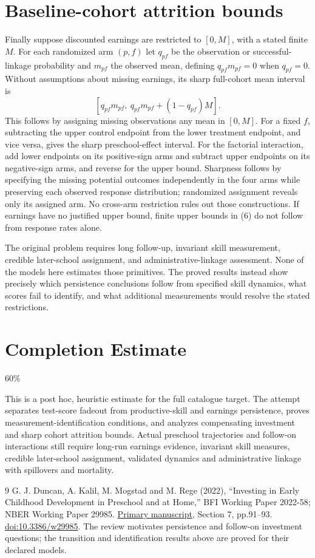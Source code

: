 \documentclass[11pt,a4paper]{article}
\theoremstyle{remark}
\begin{document}
\section{Baseline-cohort attrition bounds}
Finally suppose discounted earnings are restricted to $[0,M]$, with a stated finite $M$. For each randomized arm $(p,f)$ let $q_{pf}$ be the observation or successful-linkage probability and $m_{pf}$ the observed mean, defining $q_{pf}m_{pf}=0$ when $q_{pf}=0$. Without assumptions about missing earnings, its sharp full-cohort mean interval is
\[
 [q_{pf}m_{pf},\ q_{pf}m_{pf}+(1-q_{pf})M]. \tag{6}
\]
This follows by assigning missing observations any mean in $[0,M]$. For a fixed $f$, subtracting the upper control endpoint from the lower treatment endpoint, and vice versa, gives the sharp preschool-effect interval. For the factorial interaction, add lower endpoints on its positive-sign arms and subtract upper endpoints on its negative-sign arms, and reverse for the upper bound. Sharpness follows by specifying the missing potential outcomes independently in the four arms while preserving each observed response distribution; randomized assignment reveals only its assigned arm. No cross-arm restriction rules out those constructions. If earnings have no justified upper bound, finite upper bounds in (6) do not follow from response rates alone.

The original problem requires long follow-up, invariant skill measurement, credible later-school assignment, and administrative-linkage assessment. None of the models here estimates those primitives. The proved results instead show precisely which persistence conclusions follow from specified skill dynamics, what scores fail to identify, and what additional measurements would resolve the stated restrictions.

\section{Completion Estimate}
60\%

This is a post hoc, heuristic estimate for the full catalogue target.
The attempt separates test-score fadeout from productive-skill and earnings persistence, proves measurement-identification conditions, and analyzes compensating investment and sharp cohort attrition bounds. Actual preschool trajectories and follow-on interactions still require long-run earnings evidence, invariant skill measures, credible later-school assignment, validated dynamics and administrative linkage with spillovers and mortality.

\begin{thebibliography}{9}
 G. J. Duncan, A. Kalil, M. Mogstad and M. Rege (2022), ``Investing in Early Childhood Development in Preschool and at Home,'' BFI Working Paper 2022-58; NBER Working Paper 29985. \href{https://bfi.uchicago.edu/wp-content/uploads/2022/05/BFI_WP_2022-58.pdf}{Primary manuscript}, Section 7, pp.91--93. \href{https://doi.org/10.3386/w29985}{doi:10.3386/w29985}. The review motivates persistence and follow-on investment questions; the transition and identification results above are proved for their declared models.
\end{thebibliography}
\end{document}

